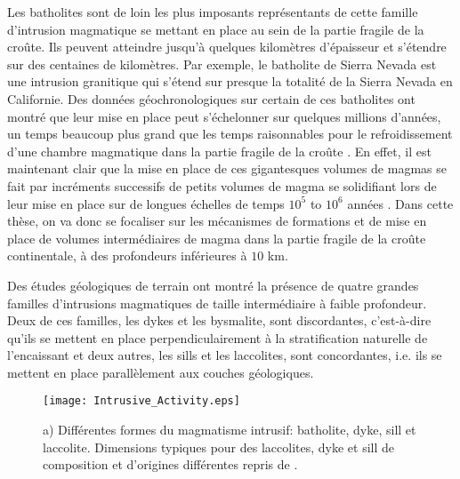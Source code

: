 Les batholites sont de loin  les plus imposants représentants de cette
famille  d'intrusion magmatique  se mettant  en  place au  sein de  la
partie fragile de  la croûte.  Ils peuvent  atteindre jusqu'à quelques
kilomètres d'épaisseur  et s'étendre sur des  centaines de kilomètres.
Par  exemple,  le  batholite  de   Sierra  Nevada  est  une  intrusion
granitique qui s'étend sur presque la  totalité de la Sierra Nevada en
Californie.   Des   données  géochronologiques  sur  certain   de  ces
batholites ont  montré que  leur mise en  place peut  s'échelonner sur
quelques millions d'années, un temps beaucoup plus grand que les temps
raisonnables pour le refroidissement  d'une chambre magmatique dans la
partie fragile de  la croûte \citep{Glazner:2004gv}. En  effet, il est
maintenant clair que  la mise en place de ces  gigantesques volumes de
magmas se fait par incréments successifs de petits volumes de magma se
solidifiant lors  de leur  mise en  place sur  de longues  échelles de
temps $10^5$  to $10^6$  années \citep{Petford:2000cc,Glazner:2004gv}.
Dans  cette thèse,  on  va donc  se focaliser  sur  les mécanismes  de
formations et de mise en place de volumes intermédiaires de magma dans
la  partie  fragile  de  la croûte  continentale,  à  des  profondeurs
inférieures à $10$ km.

Des études  géologiques de  terrain ont montré  la présence  de quatre
grandes familles  d'intrusions magmatiques  de taille  intermédiaire à
faible profondeur.  Deux de ces  familles, les dykes et les bysmalite,
sont   discordantes,  c'est-à-dire   qu'ils   se   mettent  en   place
perpendiculairement à  la stratification naturelle de  l'encaissant et
deux autres, les sills et  les laccolites, sont concordantes, i.e. ils
se mettent en place parallèlement aux couches géologiques.

\begin{figure}[htpb]
  \begin{center}
    \graphicspath{ {/Users/thorey/Documents/These/Manuscript/Figure/Chapter1/} }
    \texttt{[image: Intrusive\_Activity.eps]}
    \caption{a) Différentes formes  du magmatisme intrusif: batholite,
      dyke,  sill   et  laccolite.    Dimensions  typiques   pour  des
      laccolites,   dyke  et   sill  de   composition  et   d'origines
      différentes repris de \citet{Cruden:tg}. }
    \label{Dimension}
  \end{center}
\end{figure}

